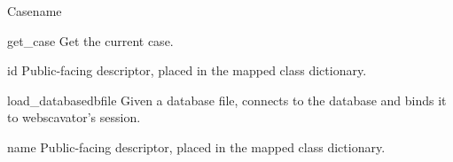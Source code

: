 \documentclass[letterpaper,10pt,english]{manual}
\begin{document}
\begin{classdesc}{Case}{name}
\hypertarget{webscavator.model.models.Case.get_case}{}\begin{staticmethoddesc}{get\_case}{}
Get the current case.
\end{staticmethoddesc}

\hypertarget{webscavator.model.models.Case.id}{}\begin{memberdesc}{id}
Public-facing descriptor, placed in the mapped class dictionary.
\end{memberdesc}

\hypertarget{webscavator.model.models.Case.load_database}{}\begin{staticmethoddesc}{load\_database}{dbfile}
Given a database file, connects to the database and binds it to webscavator's session.
\end{staticmethoddesc}

\hypertarget{webscavator.model.models.Case.name}{}\begin{memberdesc}{name}
Public-facing descriptor, placed in the mapped class dictionary.
\end{memberdesc}
\end{classdesc}
\end{document}
